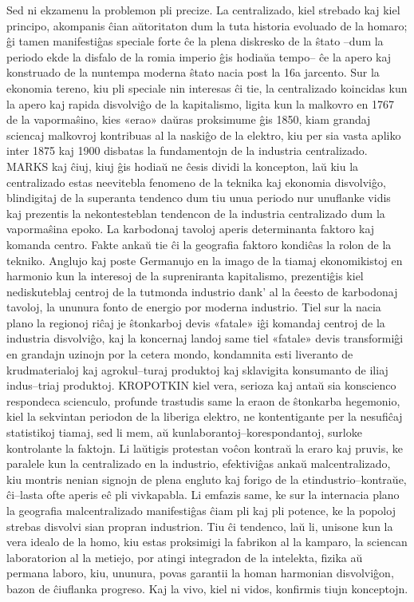 Sed ni ekzamenu la problemon pli precize. La centralizado, kiel strebado kaj kiel principo, akompanis ĉian aŭtoritaton dum la tuta historia evoluado de la homaro; ĝi tamen manifestiĝas speciale forte ĉe la plena diskresko de la ŝtato –dum la periodo ekde la disfalo de la romia imperio ĝis hodiaŭa tempo– ĉe la apero kaj konstruado de la nuntempa moderna ŝtato nacia post la 16a jarcento. Sur la ekonomia tereno, kiu pli speciale nin interesas ĉi tie, la centralizado koincidas kun la apero kaj rapida disvolviĝo de la kapitalismo, ligita kun la malkovro en 1767 de la vapormaŝino, kies «erao» daŭras proksimume ĝis 1850, kiam grandaj sciencaj malkovroj kontribuas al la naskiĝo de la elektro, kiu per sia vasta apliko inter 1875 kaj 1900 disbatas la fundamentojn de la industria centralizado. MARKS kaj ĉiuj, kiuj ĝis hodiaŭ ne ĉesis dividi la koncepton, laŭ kiu la centralizado estas neevitebla fenomeno de la teknika kaj ekonomia disvolviĝo, blindigitaj de la superanta tendenco dum tiu unua periodo nur unuflanke vidis kaj prezentis la nekontesteblan tendencon de la industria centralizado dum la vapormaŝina epoko. La karbodonaj tavoloj aperis determinanta faktoro kaj komanda centro. Fakte ankaŭ tie ĉi la geografia faktoro kondiĉas la rolon de la tekniko. Anglujo kaj poste Germanujo en la imago de la tiamaj ekonomikistoj en harmonio kun la interesoj de la supreniranta kapitalismo, prezentiĝis kiel nediskuteblaj centroj de la tutmonda industrio dank' al la ĉeesto de karbodonaj tavoloj, la ununura fonto de energio por moderna industrio. Tiel sur la nacia plano la regionoj riĉaj je ŝtonkarboj devis «fatale» iĝi komandaj centroj de la industria disvolviĝo, kaj la koncernaj landoj same tiel «fatale» devis transformiĝi en grandajn uzinojn por la cetera mondo, kondamnita esti liveranto de krudmaterialoj kaj agrokul–turaj produktoj kaj sklavigita konsumanto de iliaj indus–triaj produktoj. KROPOTKIN kiel vera, serioza kaj antaŭ sia konscienco respondeca scienculo, profunde trastudis same la eraon de ŝtonkarba hegemonio, kiel la sekvintan periodon de la liberiga elektro, ne kontentigante per la nesufiĉaj statistikoj tiamaj, sed li mem, aŭ kunlaborantoj–korespondantoj, surloke kontrolante la faktojn. Li laŭtigis protestan voĉon kontraŭ la eraro kaj pruvis, ke paralele kun la centralizado en la industrio, efektiviĝas ankaŭ malcentralizado, kiu montris nenian signojn de plena engluto kaj forigo de la etindustrio–kontraŭe, ĉi–lasta ofte aperis eĉ pli vivkapabla. Li emfazis same, ke sur la internacia plano la geografia malcentralizado manifestiĝas ĉiam pli kaj pli potence, ke la popoloj strebas disvolvi sian propran industrion. Tiu ĉi tendenco, laŭ li, unisone kun la vera idealo de la homo, kiu estas proksimigi la fabrikon al la kamparo, la sciencan laboratorion al la metiejo, por atingi integradon de la intelekta, fizika aŭ permana laboro, kiu, ununura, povas garantii la homan harmonian disvolviĝon, bazon de ĉiuflanka progreso. Kaj la vivo, kiel ni vidos, konfirmis tiujn konceptojn.

